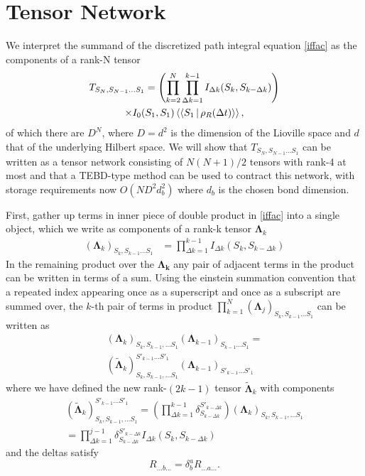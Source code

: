 \documentclass[a4paper, aps, pra,twocolumn]{revtex4-1}
\newcommand{\dbraket}[1]{\left\langle\Braket{#1}\right\rangle}
\begin{document}
\section{Tensor Network}
We interpret the summand of the discretized path integral equation \eqref{iffac} as the components of a rank-N tensor
\begin{multline} \label{inftens}
 T_{S_N, S_{N-1} \ldots S_1}=\left(\prod_{k=2}^N \prod_{\Delta k =1}^{k-1} I_{\Delta k}(S_k,S_{k-\Delta k})\right)\\
\times I_{0}(S_1,S_1) \dbraket{S_1 |\rho_R(\Delta t)},
\end{multline}
of which there are $D^N$, where $D=d^2$ is the dimension of the Lioville space and $d$ that of the underlying Hilbert space.
We will show that $T_{S_N, S_{N-1} \ldots S_1}$ can be written as a tensor network consisting of $N(N+1)/2$ tensors with rank-4 at most and that a TEBD-type method can be used to contract this network, with storage requirements now $O(N D^2 d_b^2)$ where $d_b$ is the chosen bond dimension.

First, gather up terms in inner piece of double product in \eqref{iffac} into a single object, which we write as components of a rank-k tensor $\mathbf{\Lambda}_k$
\begin{align}\label{lamdef}
 (\mathbf{\Lambda}_k)_{S_k, S_{k-1} \ldots S_{1}}&= \prod_{\Delta k =1}^{k-1} I_{\Delta k}(S_k,S_{k-\Delta k})
\end{align}
In the remaining product over the $\mathbf{\Lambda_k}$ any pair of adjacent terms in the product can be written in terms of a sum.  Using the einstein summation convention that a repeated index appearing once as a superscript and once as a subscript are summed over, the $k$-th pair of terms in product $\prod_{k=1}^{N}(\mathbf{\Lambda}_j)_{S_k, S_{k-1} \ldots S_{1}}$ can be written as
\begin{multline}
 (\mathbf{\Lambda}_k)_{S_{k}, S_{k-1}, \ldots S_{1}} (\mathbf{\Lambda}_{k-1})_{ S_{k-1} \ldots S_{1}} = \\
  (\tilde{\mathbf{\Lambda}}_k)_{ S_k, S_{k-1}, \ldots S_{1}}^{S'_{k-1} \ldots S'_{1}} (\mathbf{\Lambda}_{k-1})_{ S'_{k-1} \ldots S'_{1}}
\end{multline}
where we have defined the new rank-$(2k-1)$ tensor $\tilde{\mathbf{\Lambda}}_k$ with components
\begin{multline}
  (\tilde{\mathbf{\Lambda}}_k)_{S_k, S_{k-1}, \ldots S_{1}}^{ S'_{k-1} \ldots S'_{1}}=\left(\prod_{\Delta k=1}^{k-1} \delta_{S_{k-\Delta k}}^{S'_{k-\Delta k}}\right) (\mathbf{\Lambda}_k)_{ S_k, S_{k-1}, \ldots S_{1}}\\
  =  \prod_{\Delta k=1}^{j-1} \delta_{S_{k-\Delta k}}^{S'_{k-\Delta k}} I_{\Delta k}(S_{k},S_{k-\Delta k})
\end{multline}
and the deltas satisfy
\begin{equation}
R_{... b ...}= \delta^a_b R_{... a ...}.
\end{equation}
\end{document}
